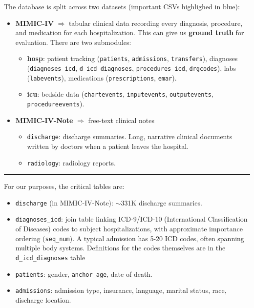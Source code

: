 \documentclass[11pt,a4paper]{article}
\newcommand{\field}[1]{\nolinkurl{#1}}
\newcommand{\importantfield}[1]{\textcolor{betterblue}{\nolinkurl{#1}}}
\begin{document}
The database is split across two datasets (important CSVs highlighed in \textcolor{betterblue}{blue}):
\begin{itemize}[leftmargin=*]
	\item \textbf{MIMIC-IV} $\Rightarrow$ tabular clinical data recording every diagnosis, procedure, and medication for each hospitalization. This can give us \textbf{ground truth} for evaluation. There are two submodules:

	      \begin{itemize}[itemsep=1pt, parsep=0pt]
		      \item \textbf{hosp}: patient tracking (\importantfield{patients}, \importantfield{admissions}, \field{transfers}), diagnoses (\importantfield{diagnoses\_icd}, \importantfield{d\_icd\_diagnoses}, \field{procedures\_icd}, \field{drgcodes}), labs (\field{labevents}), medications (\field{prescriptions}, \field{emar}).
		      \item \textbf{icu}: bedside data (\field{chartevents}, \field{inputevents}, \field{outputevents}, \field{procedureevents}).
	      \end{itemize}

	\item \textbf{MIMIC-IV-Note} $\Rightarrow$ free-text clinical notes
	      \begin{itemize}[itemsep=1pt, parsep=0pt]
		      \item \importantfield{discharge}: discharge summaries. Long, narrative clinical documents written by doctors when a patient leaves the hospital.
		      \item \field{radiology}: radiology reports.
	      \end{itemize}
\end{itemize}

\bigskip\hrule\bigskip
For our purposes, the critical tables are:
\begin{itemize}[itemsep=2pt, parsep=1pt]
	\item \importantfield{discharge} (in MIMIC-IV-Note): $\sim$331K discharge summaries.
	\item \importantfield{diagnoses\_icd}: join table linking ICD-9/ICD-10 (International Classification of Diseases) codes to subject hospitalizations, with approximate importance ordering (\field{seq\_num}). A typical admission has 5-20 ICD codes, often spanning multiple body systems. Definitions for the codes themselves are in the \importantfield{d\_icd\_diagnoses} table
	\item \importantfield{patients}: gender, \field{anchor\_age}, date of death.
	\item \importantfield{admissions}: admission type, insurance, language, marital status, race, discharge location.
\end{itemize}
\end{document}
